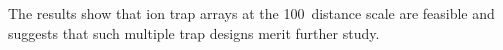 %
%

The results show that ion trap arrays at the 100\um\, distance scale are feasible and suggests that such multiple trap designs merit further study.







